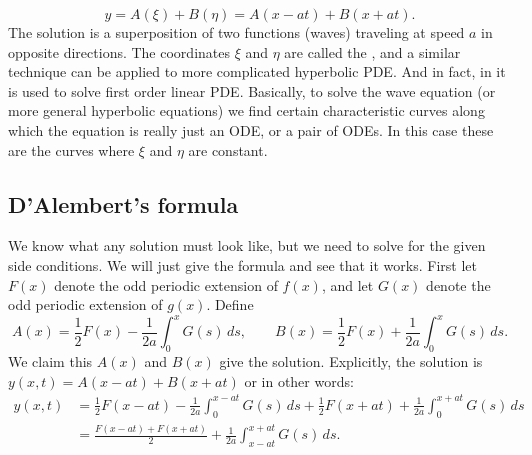 \documentclass{ximera}
\begin{document}
\begin{equation*}
    y = A(\xi) + B(\eta) = A(x-at) + B(x+at) .
\end{equation*}
The solution is a superposition of two functions (waves) traveling at speed $a$ in opposite directions.  The coordinates $\xi$ and $\eta$ are called the \emph{}, and a similar technique can be applied to more complicated hyperbolic PDE\@. And in fact, in  it is used to solve first order linear PDE\@.  Basically, to solve the wave equation (or more general hyperbolic equations) we find certain characteristic curves along which the equation is really just an ODE\@, or a pair of ODEs.  In this case these are the curves where $\xi$ and $\eta$ are constant.

\subsection{D'Alembert's formula}

We know what any solution must look like, but we need to solve for the given side conditions.  We will just give the formula and see that it works. First let $F(x)$ denote the odd periodic extension of $f(x)$, and let $G(x)$ denote the odd periodic extension of $g(x)$.  Define
\begin{equation*}
    A(x) = \frac{1}{2} F(x) - \frac{1}{2a} \int_0^x G(s) \,ds , \qquad B(x) = \frac{1}{2} F(x) + \frac{1}{2a} \int_0^x G(s) \,ds .
\end{equation*}
We claim this $A(x)$ and $B(x)$ give the solution.  Explicitly, the solution is $y(x,t) = A(x-at) + B(x+at)$ or in other words:
\begin{equation} \label{dalemb:form}
    \begin{aligned}
        y(x,t) & =
        \frac{1}{2} F(x-at) - \frac{1}{2a} \int_0^{x-at} G(s) \,ds  +
        \frac{1}{2} F(x+at) + \frac{1}{2a} \int_0^{x+at} G(s) \,ds \\
        & = \frac{F(x-at) + F(x+at)}{2} + \frac{1}{2a} \int_{x-at}^{x+at} G(s) \,ds .
    \end{aligned}
\end{equation}
\end{document}
